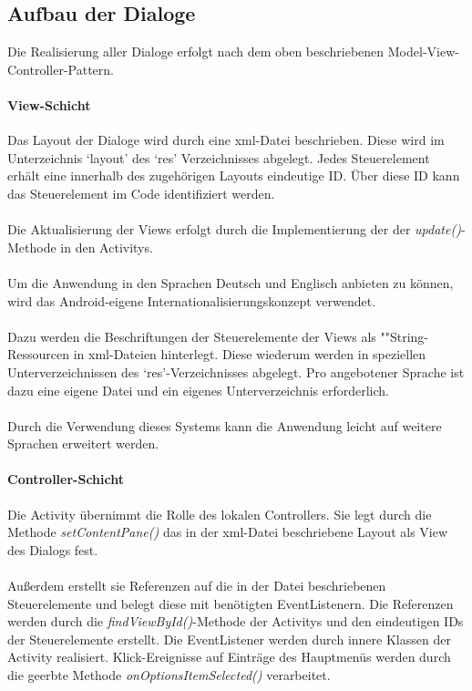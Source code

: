 \documentclass[10pt,a4paper]{article}
\begin{document}
		\subsection{Aufbau der Dialoge}
	Die Realisierung aller Dialoge erfolgt nach dem oben beschriebenen Model-View-Controller-Pattern.
	
	\paragraph*{View-Schicht} Das Layout der Dialoge wird durch eine xml-Datei beschrieben. Diese wird im Unterzeichnis `layout' des `res'
	Verzeichnisses abgelegt. Jedes Steuerelement erhält eine innerhalb des zugehörigen Layouts eindeutige ID. Über diese ID kann das Steuerelement
	im Code identifiziert werden. \\ \\
	Die Aktualisierung der Views erfolgt durch die Implementierung der der \textit{update()}-Methode in den Activitys. \\ \\
	Um die Anwendung in den Sprachen Deutsch und Englisch anbieten zu können, wird das Android-eigene Internationalisierungskonzept verwendet. \\ \\
	Dazu werden die Beschriftungen der Steuerelemente der Views als ""String-Res\-sour\-cen in xml-Dateien hinterlegt. Diese wiederum werden in
	speziellen Unterverzeichnissen des `res'-Verzeichnisses abgelegt. Pro angebotener Sprache ist dazu eine eigene Datei und ein eigenes
	Unterverzeichnis erforderlich. \\ \\
	Durch die Verwendung dieses Systems kann die Anwendung leicht auf weitere Sprachen erweitert werden.
	
	\paragraph*{Controller-Schicht} Die Activity übernimmt die Rolle des lokalen Controllers. Sie legt durch die Methode \textit{setContentPane()}
	das in der xml-Datei beschriebene Layout als View des Dialogs fest. \\ \\
	Außerdem erstellt sie Referenzen auf die in der Datei beschriebenen Steuerelemente und belegt diese mit benötigten EventListenern. Die Referenzen
	werden durch die \textit{findViewById()}-Methode der Activitys und den eindeutigen IDs der Steuerelemente erstellt. Die EventListener werden
	durch innere Klassen der Activity realisiert. Klick-Ereignisse auf Einträge des Hauptmenüs werden durch die geerbte Methode 
	\textit{onOptionsItemSelected()} verarbeitet. \\ \\
	
\end{document}

